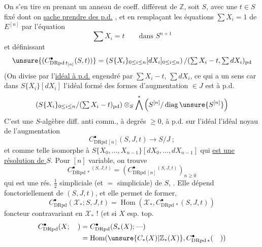 On s'en tire en prenant un anneau de coeff. différent de $\mathbb Z$, soit $S$, avec une   $t\in S$ fixé dont on \uline{sache prendre des p.d.} , et en remplaçant les équations $\sum X_i=1$ de $E^{[n]}$ par l'équation
\[
\sum X_i=t\qquad\text{dans }S^{n+1}
\]
et définissant
\[
\unsure{(C^\bullet_{\mathrm{DRpd}\,t_{[n]}}(S,t))}=\left(S\{X_i\}_{0\leq i\leq n}[dX_i]_{0\leq i\leq n}\right)/(\textstyle\sum X_i-t,\sum dX_i)_{\mathrm{pd}}
\]
(On divise par l'\uline{idéal à p.d.} engendré par $\sum X_i-t$, $\sum dX_i$, ce qui a un sens
car dans $S\{X_i\}[dX_i]$ l'idéal formé des formes  d'augmentation $\in J$ est à p.d.
\[
\left(S\{X_i\}_{0\leq i\leq n}/(\textstyle\sum X_i-t)_{\mathrm{pd}}\right)\otimes_S\bigwedge^*\left(S^{[n]}/\operatorname{diag}\unsure{S^{[n]}}\right)
\]
C'est une $S$-algèbre diff.  anti comm., à degrés $\geq0$,  à p.d. sur l'idéal  l'idéal noyau de l'augmentation
\[
C^\bullet_{\mathrm{DRpd}\,[n]}(S,J,t)\longrightarrow S/J\ ;
\]
et comme telle isomorphe à $S\{X_0,\ldots,X_{n-1}\}[dX_0,\ldots,dX_{n-1}]$ qui \uline{est une résolution de $S$}.
Pour $[n]$ variable, on trouve
\[
C^\bullet_{\mathrm{DRpd}\,*}{}^{(S,J,t)}=\left(C^\bullet_{\mathrm{DRpd}\,[n]}{}^{(S,J,t)}\right)_{n\geq0}
\]
qui est une rés. $\frac12$ simpliciale (et $=$ simpliciale) de $S$, . Elle dépend fonctoriellement de $(S,J,t)$, et elle permet de former, 
\[
C^\bullet_{\mathrm{DRpd}}(\mathcal X_*;S,J,t)=\operatorname{Hom}(\mathcal X_*,C^\bullet_{\mathrm{DRpd}\,*}(S,J,t))
\]
foncteur contravariant en $\mathcal X_*$ ! (et si $X$ esp. top.
\[
\begin{aligned}
C^\bullet_{\mathrm{DRpd}}(X;\quad)&=C^\bullet_{\mathrm{DRpd}}(S_*(X);\text{---})\\
&=\operatorname{Hom}(\unsure{C_*(X)|\mathbb Z_*(X)},C^\bullet_{\mathrm{DRpd}\,*}(\quad))
\end{aligned}
\]
